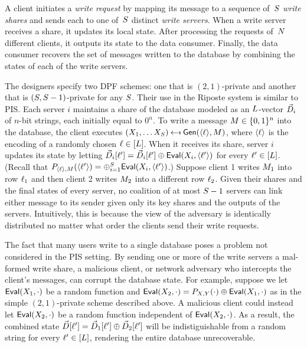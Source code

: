A client initiates a \emph{write request} by mapping its message to a sequence
of~$S$ \emph{write shares} and sends each to one of~$S$ distinct
\emph{write servers}. When a write server receives a share, it updates its local
state.  After processing the requests of~$N$ different clients, it
outputs its state to the data consumer. Finally, the data consumer recovers the
set of messages written to the database by combining the states of each of the
write servers.

The designers specify two DPF schemes: one that is $(2,1)$-private and another
that is $(S, S-1)$-private for any $S$. Their use in the
Riposte system is similar to PIS. Each server $i$ maintains a share of the
database modeled as an $L$-vector $\vec{D}_i$ of $n$-bit strings, each
initially equal to $0^n$. To write a message $M \in \{0,1\}^n$ into the
database, the client executes $(X_1, \ldots X_\sharect) \getsr \gen(\str{\idx},
\msg)$, where $\langle \ell \rangle$ is the encoding of a randomly chosen
$\ell\in[L]$. When it receives its share, server $i$ updates its state by
letting $\vec{D}_i[\ell^\prime] = \vec{D}_i[\ell^\prime] \mathbin{\oplus} \mathsf{Eval}(X_i,
\langle \ell^\prime \rangle)$ for every $\ell^\prime\in[L]$. (Recall that
$P_{\langle \ell \rangle,M}(\langle \ell^\prime \rangle) = \mathbin{\oplus}_{i=1}^S \mathsf{Eval}(X_i,
\langle \ell^\prime \rangle)$.) Suppose client 1 writes $M_1$ into row $\ell_1$ and
then client 2 writes $M_2$ into a different row $\ell_2$.  Given their shares
and the final states of every server, no coalition of at most $S-1$
servers can link either message to its sender given only its key shares and the
outputs of the servers. Intuitively, this is because the view of the adversary
is identically distributed no matter what order the clients send their write
requests.

The fact that many users write to a single database poses a problem not
considered in the PIS setting. By sending one or more of the write servers a
mal-formed write share, a malicious client, or network adversary who intercepts
the client's messages, can corrupt the database state.
%
For example, suppose we let $\mathsf{Eval}(X_1, \cdot)$ be a random function and
$\mathsf{Eval}(X_2, \cdot) = P_{X,Y}(\cdot) \mathbin{\oplus} \mathsf{Eval}(X_1, \cdot)$ as in the simple
$(2,1)$-private scheme described above.
%
A malicious client could instead let $\mathsf{Eval}(X_2, \cdot)$ be a random function
independent of $\mathsf{Eval}(X_2, \cdot)$.
As a result, the combined state $\vec{D}[\ell^\prime] = \vec{D}_1[\ell^\prime] \mathbin{\oplus}
\vec{D}_2[\ell^\prime]$ will be indistiguishable from a random string for every
$\ell^\prime \in[L]$, rendering the entire database unrecoverable.

